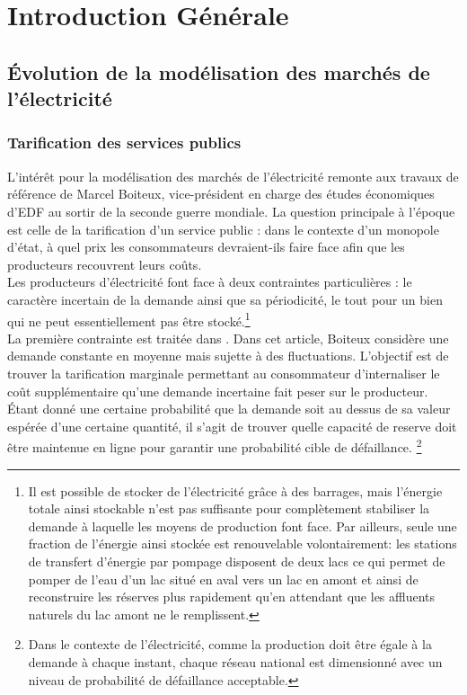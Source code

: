 \newpage
\section*{Introduction Générale}
\subsection*{Évolution de la modélisation des marchés de l'électricité}
\subsubsection*{Tarification des services publics}

L'intérêt pour la modélisation des marchés de l'électricité remonte aux travaux de référence de Marcel Boiteux, vice-président en charge des études économiques d'EDF au sortir de la seconde guerre mondiale. La question principale à l'époque est celle de la tarification d'un service public : dans le contexte d'un monopole d'état, à quel prix les consommateurs devraient-ils faire face afin que les producteurs recouvrent leurs coûts. \\

Les producteurs d'électricité font face à deux contraintes particulières : le caractère incertain de la demande ainsi que sa périodicité, le tout pour un bien qui ne peut essentiellement pas être stocké.\footnote{Il est possible de stocker de l'électricité grâce à des barrages, mais l'énergie totale ainsi stockable n'est pas suffisante pour complètement stabiliser la demande à laquelle les moyens de production font face. Par ailleurs, seule une fraction de l'énergie ainsi stockée est renouvelable volontairement: les stations de transfert d'énergie par pompage disposent de deux lacs ce qui permet de pomper de l'eau d'un lac situé en aval vers un lac en amont et ainsi de reconstruire les réserves plus rapidement qu'en attendant que les affluents naturels du lac amont ne le remplissent.}\\

La première contrainte est traitée dans \cite{boiteux1951tarification}. Dans cet article, Boiteux considère une demande constante en moyenne mais sujette à des fluctuations. L'objectif est de trouver la tarification marginale permettant au consommateur d'internaliser le coût supplémentaire qu'une demande incertaine fait peser sur le producteur. Étant donné une certaine probabilité que la demande soit au dessus de sa valeur espérée d'une certaine quantité, il s'agit de trouver quelle capacité de reserve doit être maintenue en ligne pour garantir une probabilité cible de défaillance. \footnote{Dans le contexte de l'électricité, comme la production doit être égale à la demande à chaque instant, chaque réseau national est dimensionné avec un niveau de probabilité de défaillance acceptable. }\\

